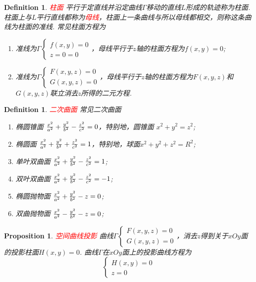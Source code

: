 \documentclass{article}
\newtheorem{proposition}[theorem]{Proposition}
\newtheorem{definition}[theorem]{Definition}
\newcommand{\redt}[1]{\textcolor{red}{#1}}
\begin{document}
\begin{definition}
\rm \redt{柱面} 平行于定直线并沿定曲线$\Gamma$移动的直线$L$形成的轨迹称为柱面. 柱面上与$L$平行直线都称为\redt{母线}，柱面上一条曲线与所以母线都相交，则称这条曲线为柱面的准线. 常见柱面方程为
\begin{enumerate}
	\item 准线为$\Gamma \left\{ \begin{array}{ll} f(x,y) = 0 \\ z = 0 = 0 \end{array} \right.$，母线平行于$z$轴的柱面方程为$f(x,y) = 0$;
	\item 准线为$\Gamma \left\{\begin{array}{ll} F(x,y,z) = 0 \\ G(x,y,z) = 0 \end{array}\right.$，母线平行于$z$轴的柱面方程为$F(x,y,z)$和$G(x,y,z)$联立消去$z$所得的二元方程. 
\end{enumerate}
\end{definition}

\begin{definition}
\rm \redt{二次曲面} 常见二次曲面
\begin{enumerate}
	\item 椭圆锥面 ${x^{2} \over a^{2}}+{y^{2} \over b^{2}}-{z^{2} \over c^{2}}=0$，特别地，圆锥面 $x^2 + y^2 = z^2$;
	\item 椭圆面 ${x^{2} \over a^{2}}+{y^{2} \over b^{2}}+{z^{2} \over c^{2}}=1$，特别地，球面$x^2+y^2+z^2 = R^2$;
	\item 单叶双曲面 ${x^{2} \over a^{2}}+{y^{2} \over b^{2}}-{z^{2} \over c^{2}}=1$;
	\item 双叶双曲面 ${x^{2} \over a^{2}}+{y^{2} \over b^{2}}-{z^{2} \over c^{2}}=-1$;
	\item 椭圆抛物面 ${x^{2} \over a^{2}}+{y^{2} \over b^{2}}-z=0$;
	\item 双曲抛物面 ${x^{2} \over a^{2}}-{y^{2} \over b^{2}}-z=0$;
\end{enumerate}
\end{definition}


\begin{proposition}
\rm \redt{空间曲线投影} 曲线$\Gamma \left\{\begin{array}{ll} F(x,y,z) = 0 \\ G(x,y,z) = 0 \end{array}\right.$，消去$z$得到关于$xOy$面的投影柱面$H(x,y)=0$. 曲线$\Gamma$在$xOy$面上的投影曲线方程为
$$
\left \{
\begin{array}{ll}
H(x,y) = 0\\
z = 0
\end{array} \right. 
$$
\end{proposition}
\end{document}
